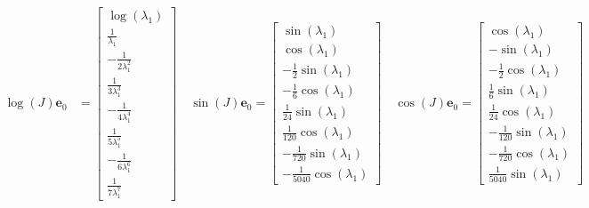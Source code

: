 \begin{displaymath}
\begin{split}
\log{\left (J \right )} \boldsymbol{e}_{0} &= \left[\begin{matrix}\log{\left (\lambda_{1} \right )}\\\frac{1}{\lambda_{1}}\\- \frac{1}{2 \lambda_{1}^{2}}\\\frac{1}{3 \lambda_{1}^{3}}\\- \frac{1}{4 \lambda_{1}^{4}}\\\frac{1}{5 \lambda_{1}^{5}}\\- \frac{1}{6 \lambda_{1}^{6}}\\\frac{1}{7 \lambda_{1}^{7}}\end{matrix}\right] \quad
\sin{\left (J \right )} \boldsymbol{e}_{0} = \left[\begin{matrix}\sin{\left (\lambda_{1} \right )}\\\cos{\left (\lambda_{1} \right )}\\- \frac{1}{2} \sin{\left (\lambda_{1} \right )}\\- \frac{1}{6} \cos{\left (\lambda_{1} \right )}\\\frac{1}{24} \sin{\left (\lambda_{1} \right )}\\\frac{1}{120} \cos{\left (\lambda_{1} \right )}\\- \frac{1}{720} \sin{\left (\lambda_{1} \right )}\\- \frac{1}{5040} \cos{\left (\lambda_{1} \right )}\end{matrix}\right] \quad
\cos{\left (J \right )} \boldsymbol{e}_{0} = \left[\begin{matrix}\cos{\left (\lambda_{1} \right )}\\- \sin{\left (\lambda_{1} \right )}\\- \frac{1}{2} \cos{\left (\lambda_{1} \right )}\\\frac{1}{6} \sin{\left (\lambda_{1} \right )}\\\frac{1}{24} \cos{\left (\lambda_{1} \right )}\\- \frac{1}{120} \sin{\left (\lambda_{1} \right )}\\- \frac{1}{720} \cos{\left (\lambda_{1} \right )}\\\frac{1}{5040} \sin{\left (\lambda_{1} \right )}\end{matrix}\right] \quad
\end{split}
\end{displaymath}






